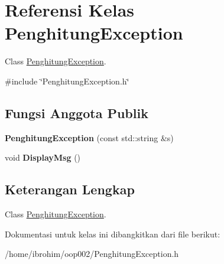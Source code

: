 \hypertarget{classPenghitungException}{}\section{Referensi Kelas Penghitung\+Exception}
\label{classPenghitungException}


Class \hyperlink{classPenghitungException}{Penghitung\+Exception}.  




{\ttfamily \#include \char`\"{}Penghitung\+Exception.\+h\char`\"{}}

\subsection*{Fungsi Anggota Publik}
\begin{DoxyCompactItemize}
\item 
\hypertarget{classPenghitungException_a988a376427f299e37cc8812497a0f0d4}{}{\bfseries Penghitung\+Exception} (const std\+::string \&s)\label{classPenghitungException_a988a376427f299e37cc8812497a0f0d4}

\item 
\hypertarget{classPenghitungException_aac32ab678c77a1b69229d89e6ed77405}{}void {\bfseries Display\+Msg} ()\label{classPenghitungException_aac32ab678c77a1b69229d89e6ed77405}

\end{DoxyCompactItemize}


\subsection{Keterangan Lengkap}
Class \hyperlink{classPenghitungException}{Penghitung\+Exception}. 

Dokumentasi untuk kelas ini dibangkitkan dari file berikut\+:\begin{DoxyCompactItemize}
\item 
/home/ibrohim/oop002/Penghitung\+Exception.\+h\end{DoxyCompactItemize}
